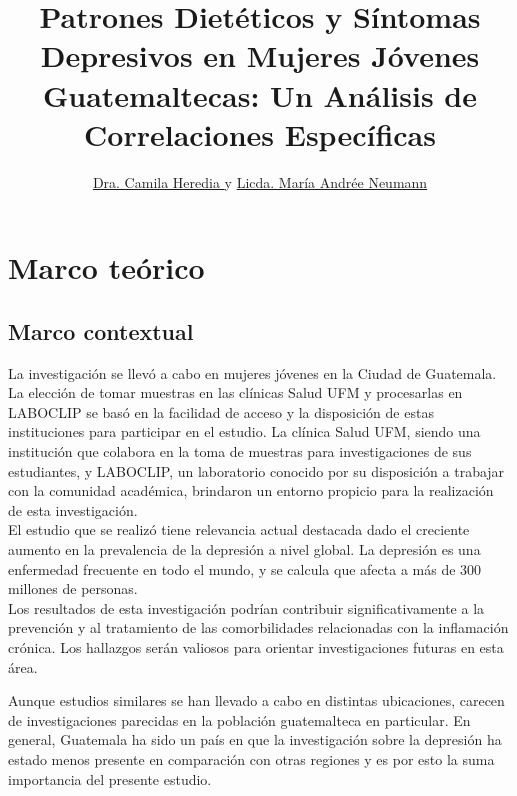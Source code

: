 \documentclass[stu, 12pt]{apa7}
\title{Patrones Dietéticos y Síntomas Depresivos en Mujeres Jóvenes Guatemaltecas: Un Análisis de Correlaciones Específicas}
\author{
	\href{https://orcid.org/0009-0008-9550-9083}{Dra. Camila Heredia \orcidlink{0009-0008-9550-9083}} 
    y 
    \href{https://orcid.org/0009-0001-2531-6058}{Licda. María Andrée Neumann \orcidlink{0009-0001-2531-6058}}
	}
\begin{document}
\maketitle




	\section{Marco teórico}\label{marco-teorico}
	\subsection{Marco contextual}\label{marco-contextual}

	La investigación se llevó a cabo en mujeres jóvenes en la Ciudad de
	Guatemala. La elección de tomar muestras en las clínicas Salud UFM y
	procesarlas en LABOCLIP se basó en la facilidad de acceso y la
	disposición de estas instituciones para participar en el estudio. La
	clínica Salud UFM, siendo una institución que colabora en la toma de
	muestras para investigaciones de sus estudiantes, y LABOCLIP, un
	laboratorio conocido por su disposición a trabajar con la comunidad
	académica, brindaron un entorno propicio para la realización de esta
	investigación.\\

	El estudio que se realizó tiene relevancia actual destacada dado el
	creciente aumento en la prevalencia de la depresión a nivel global. La
	depresión es una enfermedad frecuente en todo el mundo, y se calcula que
	afecta a más de 300 millones de personas. \\
	

	Los resultados de esta investigación podrían contribuir
	significativamente a la prevención y al tratamiento de las
	comorbilidades relacionadas con la inflamación crónica. Los hallazgos
	serán valiosos para orientar investigaciones futuras en esta área.

	Aunque estudios similares se han llevado a cabo en distintas
	ubicaciones, carecen de investigaciones parecidas en la población
	guatemalteca en particular. En general, Guatemala ha sido un país en que
	la investigación sobre la depresión ha estado menos presente en
	comparación con otras regiones y es por esto la suma importancia del
	presente estudio.\\
\end{document}
